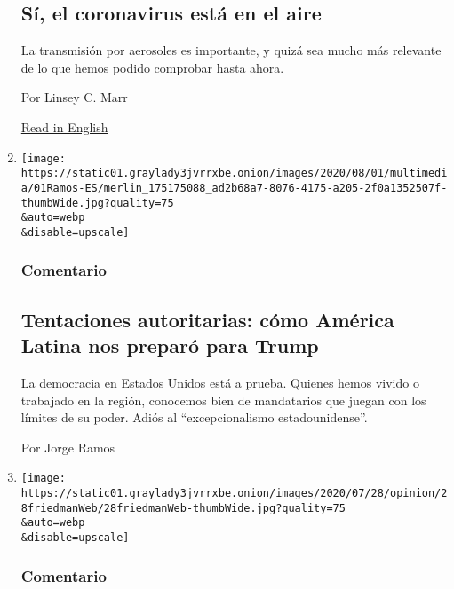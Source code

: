 \begin{enumerate}
  \hypertarget{suxed-el-coronavirus-estuxe1-en-el-aire}{%
  \subsection{Sí, el coronavirus está en el
  aire}\label{suxed-el-coronavirus-estuxe1-en-el-aire}}

  La transmisión por aerosoles es importante, y quizá sea mucho más
  relevante de lo que hemos podido comprobar hasta ahora.

  Por Linsey C. Marr

  \href{https://www.nytimes3xbfgragh.onion/2020/07/30/opinion/coronavirus-aerosols.html}{Read
  in English}
\item
  \href{/es/2020/08/01/espanol/opinion/trump-autoritarismo.html}{}

  \texttt{[image: https://static01.graylady3jvrrxbe.onion/images/2020/08/01/multimedia/01Ramos-ES/merlin\_175175088\_ad2b68a7-8076-4175-a205-2f0a1352507f-thumbWide.jpg?quality=75\\\&auto=webp\\\&disable=upscale]}

  \hypertarget{comentario-6}{%
  \subsubsection{Comentario}\label{comentario-6}}

  \hypertarget{tentaciones-autoritarias-cuxf3mo-amuxe9rica-latina-nos-preparuxf3-para-trump}{%
  \subsection{Tentaciones autoritarias: cómo América Latina nos preparó
  para
  Trump}\label{tentaciones-autoritarias-cuxf3mo-amuxe9rica-latina-nos-preparuxf3-para-trump}}

  La democracia en Estados Unidos está a prueba. Quienes hemos vivido o
  trabajado en la región, conocemos bien de mandatarios que juegan con
  los límites de su poder. Adiós al ``excepcionalismo estadounidense''.

  Por Jorge Ramos
\item
  \href{/es/2020/07/30/espanol/opinion/usar-cubrebocas-politica.html}{}

  \texttt{[image: https://static01.graylady3jvrrxbe.onion/images/2020/07/28/opinion/28friedmanWeb/28friedmanWeb-thumbWide.jpg?quality=75\\\&auto=webp\\\&disable=upscale]}

  \hypertarget{comentario-7}{%
  \subsubsection{Comentario}\label{comentario-7}}


\end{enumerate}
